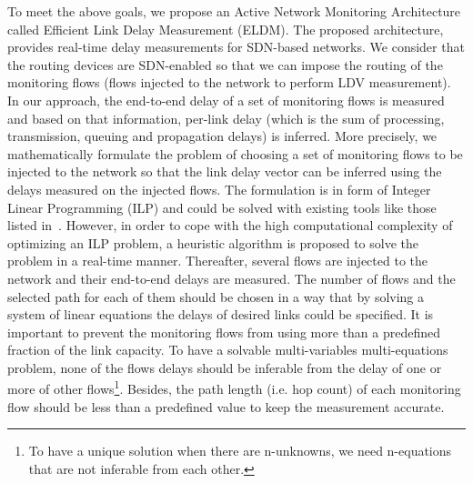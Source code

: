 \documentclass[10pt, journal, letterpaper]{IEEEtran}
\begin{document}
To meet the above goals, we propose an Active Network Monitoring Architecture called Efficient Link Delay Measurement (ELDM). The proposed architecture, provides real-time delay measurements for SDN-based networks. We consider that the routing devices are SDN-enabled so that we can impose the routing of the monitoring flows (flows injected to the network to perform LDV measurement). In our approach, the end-to-end delay of a set of monitoring flows is measured and based on that information, per-link delay (which is the sum of processing, transmission, queuing and propagation delays) is inferred. More precisely, we mathematically formulate the problem of choosing a set of monitoring flows to be injected to the network so that the link delay vector can be inferred using the delays measured on the injected flows. The formulation is in form of Integer Linear Programming (ILP) and could be solved with existing tools like those listed in~\cite{wikipedia_2020_listOptimization_software}. However, in order to cope with the high computational complexity of optimizing an ILP problem, a heuristic algorithm is proposed to solve the problem in a real-time manner. Thereafter, several flows are injected to the network and their end-to-end delays are measured. The number of flows and the selected path for each of them should be chosen in a way that by solving a system of linear equations the delays of desired links could be specified. It is important to prevent the monitoring flows from using more than a predefined fraction of the link capacity. To have a solvable multi-variables multi-equations problem, none of the flows delays should be inferable from the delay of one or more of other flows\footnote{To have a unique solution when there are n-unknowns, we need n-equations that are not inferable from each other.}. Besides, the path length (i.e. hop count) of each monitoring flow should be less than a predefined value to keep the measurement accurate.
\end{document}

